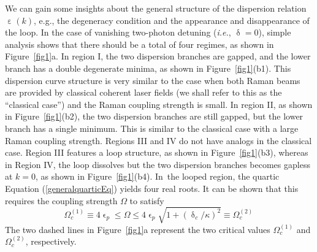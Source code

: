 \documentclass[atoms,article,accept,moreauthors,pdftex,12pt,a4paper]{mdpi}
\begin{document}
We can gain some insights about the general structure of the dispersion relation $\upepsilon(k)$, e.g., the degeneracy condition and the appearance and disappearance of the loop. In the case of vanishing two-photon detuning (\emph{i.e.}, $\updelta=0$),
simple analysis shows that there should be a total of four regimes, as shown in Figure~\ref{fig1}a. In region I, the two dispersion branches are gapped, and the lower branch has a double degenerate minima, as shown in Figure~\ref{fig1}(b1). This dispersion curve structure is very similar to the case when both Raman beams are provided by classical coherent laser fields (we shall refer to this as the ``classical case'') and the Raman coupling strength is small. In region II, as shown in Figure~\ref{fig1}(b2), the two dispersion branches are still gapped, but the lower branch has a single minimum. This is similar to the classical case with a large Raman coupling strength. Regions III and IV do not have analogs in the classical case. Region III features a loop structure, as shown in Figure~\ref{fig1}(b3), whereas in Region IV, the loop dissolves but the two dispersion branches becomes gapless at $k=0$, as shown in Figure~\ref{fig1}(b4). In~the looped region, the quartic Equation (\ref{generalquarticEq}) yields four real roots. It can be shown \cite{cavitySOC} that this requires the coupling strength $\Omega$ to satisfy
\[\Omega_c^{(1)}\equiv4\upvarepsilon_p\leq \Omega \leq  4\upvarepsilon_p \sqrt{1+(\updelta_c/\kappa)^2}\equiv\Omega_c^{(2)} \,\]
The two dashed lines in Figure~\ref{fig1}a represent the two critical values $\Omega_c^{(1)}$ and $\Omega_c^{(2)}$, respectively.
\end{document}
